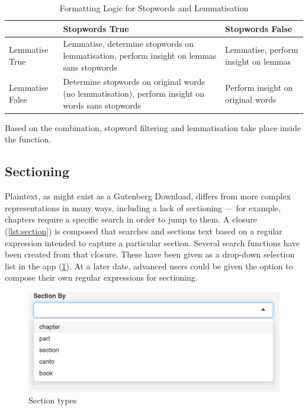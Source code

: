 \documentclass[11pt, a4paper, twoside, titlepage]{report}
\begin{document}
\begin{table}[h]
  \centering
  \begin{tabular}{p{20mm}|p{50mm}p{50mm}}
  & Stopwords True & Stopwords False\\
  \toprule
Lemmatise True & Lemmatise, determine stopwords on lemmatisation, perform insight on lemmas sans stopwords & Lemmatise, perform insight on lemmas\\
Lemmatise False & Determine stopwords on original words (no lemmatisation), perform insight on words sans stopwords & Perform insight on original words\\
\end{tabular}
\caption{Formatting Logic for Stopwords and Lemmatisation}\label{tab:formatting}
\end{table}

Based on the combination, stopword filtering and lemmatisation take
place inside the function.

\subsection{Sectioning}

Plaintext, as might exist as a Gutenberg Download, differs from more
complex representations in many ways, including a lack of sectioning
--- for example, chapters require a specific search in order to jump
to them. A closure (\cref{lst:section}) is composed that searches and
sections text based on a regular expression intended to capture a
particular section. Several search functions have been created from
that closure. These have been given as a drop-down selection list in
the app (\cref{fig:processing-section}). At a later date, advanced
users could be given the option to compose their own regular
expressions for sectioning.

\begin{figure}
\centering
\includegraphics[scale=0.7]{processing-section.png}
\caption{Section types\label{fig:processing-section}}
\end{figure}
\end{document}
